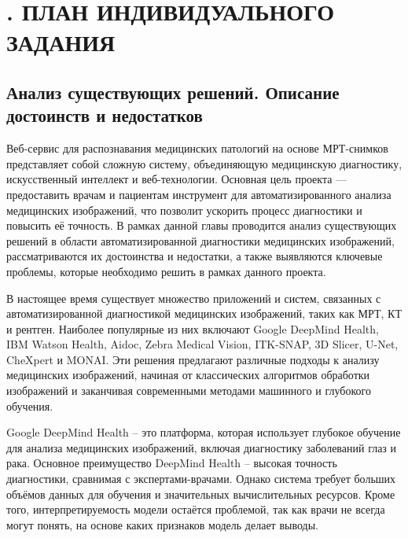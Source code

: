 \sectionbreak \section*{
  \cyrillicfont 
  \fontsize{14pt}{0pt}\selectfont
  \englishfont 
  . ПЛАН ИНДИВИДУАЛЬНОГО ЗАДАНИЯ
}

\titlespace

\subsection*{ 
  \gostTitleFont
   Анализ существующих решений. Описание достоинств и недостатков 
} 

\subtitlespace

{\gostFont

  \par \redline Веб-сервис для распознавания медицинских патологий на основе МРТ-снимков представляет собой сложную систему, объединяющую медицинскую диагностику, искусственный интеллект и веб-технологии. Основная цель проекта — предоставить врачам и пациентам инструмент для автоматизированного анализа медицинских изображений, что позволит ускорить процесс диагностики и повысить её точность. В рамках данной главы проводится анализ существующих решений в области автоматизированной диагностики медицинских изображений, рассматриваются их достоинства и недостатки, а также выявляются ключевые проблемы, которые необходимо решить в рамках данного проекта.

  \par \redline В настоящее время существует множество приложений и систем, связанных с автоматизированной диагностикой медицинских изображений, таких как МРТ, КТ и рентген. Наиболее популярные из них включают Google DeepMind Health, IBM Watson Health, Aidoc, Zebra Medical Vision, ITK-SNAP, 3D Slicer, U-Net, CheXpert и MONAI. Эти решения предлагают различные подходы к анализу медицинских изображений, начиная от классических алгоритмов обработки изображений и заканчивая современными методами машинного и глубокого обучения.

  \par \redline Google DeepMind Health – это платформа, которая использует глубокое обучение для анализа медицинских изображений, включая диагностику заболеваний глаз и рака. Основное преимущество DeepMind Health – высокая точность диагностики, сравнимая с экспертами-врачами. Однако система требует больших объёмов данных для обучения и значительных вычислительных ресурсов. Кроме того, интерпретируемость модели остаётся проблемой, так как врачи не всегда могут понять, на основе каких признаков модель делает выводы.

}

